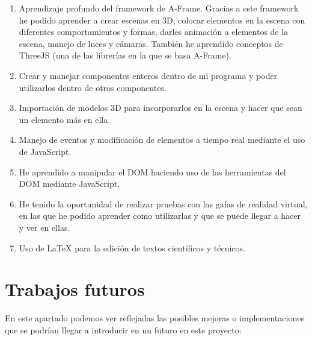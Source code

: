 \documentclass[a4paper, 12pt]{book}
\begin{document}
\begin{enumerate}
  \item Aprendizaje profundo del framework de A-Frame. Gracias a este framework he podido aprender a crear escenas en 3D, colocar elementos en la escena con diferentes comportamientos y formas, darles animación a elementos de la escena, manejo de luces y cámaras. También he aprendido conceptos de ThreeJS (una de las librerías en la que se basa A-Frame).
  
  \item Crear y manejar componentes enteros dentro de mi programa y poder utilizarlos dentro de otros componentes.
  
  \item Importación de modelos 3D para incorporarlos en la escena y hacer que sean un elemento más en ella.
  
  \item Manejo de eventos y modificación de elementos a tiempo real mediante el uso de JavaScript.
  
  \item He aprendido a manipular el DOM haciendo uso de las herramientas del DOM mediante JavaScript.
  
  \item He tenido la oportunidad de realizar pruebas con las gafas de realidad virtual, en las que he podido aprender como utilizarlas y que se puede llegar a hacer y ver en ellas.
  
  \item Uso de LaTeX para la edición de textos científicos y técnicos.
  
\end{enumerate}

\newpage
\section{Trabajos futuros}
\label{sec:trabajos_futuros}

En este apartado podemos ver reflejadas las posibles mejoras o implementaciones que se podrían llegar a introducir en un futuro en este proyecto:
\end{document}

